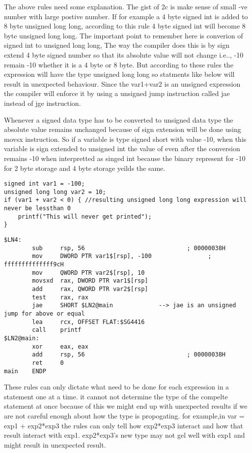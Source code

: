 \documentclass{article}
\begin{document}
The above rules need some explanation. The gist of 2c is make sense of small -ve
number with large postive number. If for example a 4 byte signed int is added
to 8 byte unsigned long long, according to this rule 4 byte signed int will
become 8 byte unsigned long long. The important point to remember here is
converion of signed int to unsigned long long, The way the compiler does this
 is by sign extend 4 byte signed number so that its absolute value will not
 change
i.e.., -10 remain -10 whether it is a 4 byte or 8 byte. But according to these
rules the expression will have the type unsigned long long so statments like
below will result in unexpected behaviour. Since the var1+var2 is an unsigned
expression the compiler will enforce it by using a unsigned jump instruction
called jae instead of jge instruction.

Whenever a signed data type has to be converted to unsigned data type the
absolute value remains unchanged because of sign extension will be done using
movsx instruction. So if a variable is type signed short with value -10, when
this variable is sign extended to unsigned int the value of even after the
conversion remains -10 when interpretted as singed int because the binary
represent for -10 for 2 byte storage and 4 byte storage yeilds the same.

\begin{verbatim}
signed int var1 = -100;
unsigned long long var2 = 10;
if (var1 + var2 < 0) { //resulting unsigned long long expression will never be lessthan 0
    printf("This will never get printed");
}
\end{verbatim}
\begin{verbatim}
$LN4:
        sub     rsp, 56                             ; 00000038H
        mov     DWORD PTR var1$[rsp], -100                ; ffffffffffffff9cH
        mov     QWORD PTR var2$[rsp], 10
        movsxd  rax, DWORD PTR var1$[rsp]
        add     rax, QWORD PTR var2$[rsp]
        test    rax, rax
        jae     SHORT $LN2@main             --> jae is an unsigned jump for above or equal
        lea     rcx, OFFSET FLAT:$SG4416
        call    printf
$LN2@main:
        xor     eax, eax
        add     rsp, 56                             ; 00000038H
        ret     0
main    ENDP
\end{verbatim}

These rules can only dictate what need to be done for each expression in a
statement one at a time.  it cannot not determine the type of the compelte
statement at once because of this we might end up with unexpected results if
we are not careful enough about how the type is propogating.
for example,in var = exp1 + exp2*exp3 the rules can only tell how exp2*exp3
interact and how that result interact with exp1. exp2*exp3's new type may not
gel well with exp1 and might result in unexpected result.
\end{document}
